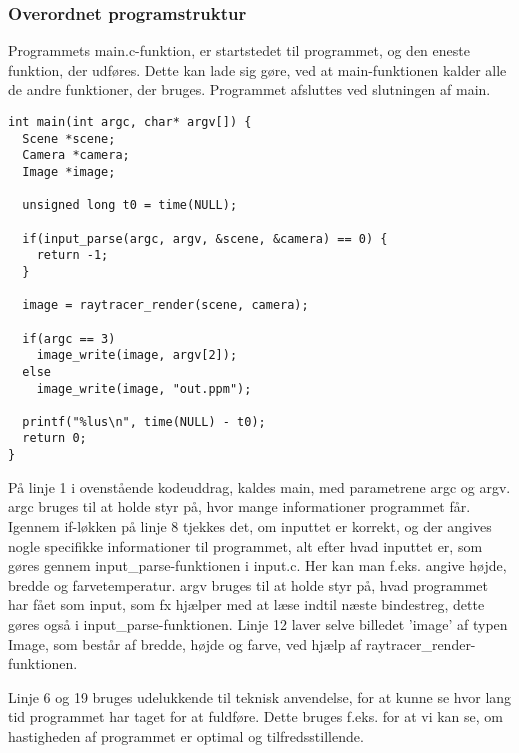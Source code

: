 \subsubsection{Overordnet programstruktur}
Programmets main.c-funktion, er startstedet til programmet, og den eneste funktion, der udføres. Dette kan lade sig gøre, ved at main-funktionen kalder alle de andre funktioner, der bruges. Programmet afsluttes ved slutningen af main.

\begin{lstlisting}[style=Cstyle, caption=Main]
int main(int argc, char* argv[]) {
  Scene *scene;
  Camera *camera;
  Image *image;

  unsigned long t0 = time(NULL);
  
  if(input_parse(argc, argv, &scene, &camera) == 0) {
    return -1;
  }
  
  image = raytracer_render(scene, camera);
  
  if(argc == 3)
    image_write(image, argv[2]);
  else
    image_write(image, "out.ppm");
  
  printf("%lus\n", time(NULL) - t0);
  return 0;
}
\end{lstlisting}

På linje 1 i ovenstående kodeuddrag, kaldes main, med parametrene argc og argv. argc bruges til at holde styr på, hvor mange informationer programmet får. Igennem if-løkken på linje 8 tjekkes det, om inputtet er korrekt, og der angives nogle specifikke informationer til programmet, alt efter hvad inputtet er, som gøres gennem input\_parse-funktionen i input.c. Her kan man f.eks. angive højde, bredde og farvetemperatur. argv bruges til at holde styr på, hvad programmet har fået som input, som fx hjælper med at læse indtil næste bindestreg, dette gøres også i input\_parse-funktionen. Linje 12 laver selve billedet 'image' af typen Image, som består af bredde, højde og farve, ved hjælp af raytracer\_render-funktionen. 

Linje 6 og 19 bruges udelukkende til teknisk anvendelse, for at kunne se hvor lang tid programmet har taget for at fuldføre. Dette bruges f.eks. for at vi kan se, om hastigheden af programmet er optimal og tilfredsstillende. 
